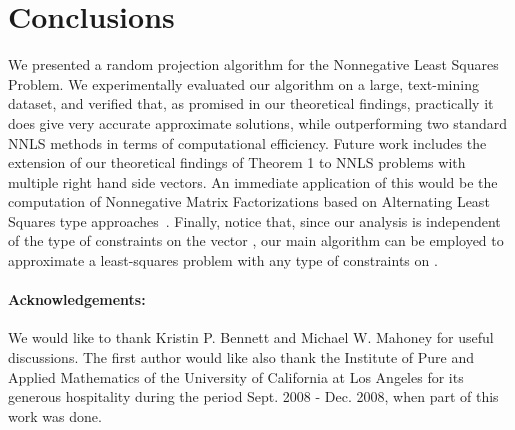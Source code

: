 \documentclass[11pt]{article}
\begin{document}
\section{Conclusions}

We presented a random projection algorithm for the Nonnegative
Least Squares Problem. We experimentally evaluated our algorithm
on a large, text-mining dataset, and verified that, as promised in
our theoretical findings, practically it does give very accurate
approximate solutions, while outperforming two standard NNLS
methods in terms of computational efficiency. Future work includes
the extension of our theoretical findings of Theorem 1 to NNLS
problems with multiple right hand side vectors. An immediate
application of this would be the computation of Nonnegative Matrix
Factorizations based on Alternating Least Squares type
approaches~\cite{KP07a, KP08}. Finally, notice that, since our
analysis is independent of the type of constraints on the vector
, our main algorithm can be employed to approximate a
least-squares problem with any type of constraints on .

\paragraph{Acknowledgements:} We would like to thank Kristin P. Bennett
and Michael W. Mahoney for useful discussions. The first author
would like also thank the Institute of Pure and Applied
Mathematics of the University of California at Los Angeles for its
generous hospitality during the period Sept. 2008 - Dec. 2008,
when part of this work was done.



\end{document}
